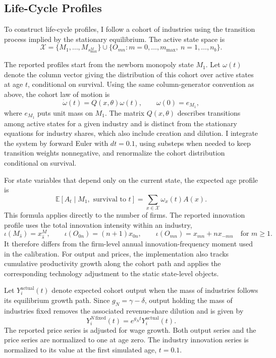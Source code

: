 \documentclass[12pt]{article}
\begin{document}
\subsection{Life-Cycle Profiles}\label{app:lifecycle}

To construct life-cycle profiles, I follow a cohort of industries using the transition process implied by the stationary equilibrium. The active state space is
\[
\mathcal X=\{M_1,\ldots,M_{s_{\max}^M}\}\cup\{O_{mn}:m=0,\ldots,m_{\max},\ n=1,\ldots,n_b\}.
\]

The reported profiles start from the newborn monopoly state \(M_1\). Let \(\omega(t)\) denote the column vector giving the distribution of this cohort over active states at age \(t\), conditional on survival. Using the same column-generator convention as above, the cohort law of motion is
\[
\dot{\omega}(t)=Q(x,\theta)\omega(t),
\qquad
\omega(0)=e_{M_1},
\]
where \(e_{M_1}\) puts unit mass on \(M_1\). The matrix \(Q(x,\theta)\) describes transitions among active states for a given industry and is distinct from the stationary equations for industry shares, which also include creation and dilution. I integrate the system by forward Euler with \(dt=0.1\), using substeps when needed to keep transition weights nonnegative, and renormalize the cohort distribution conditional on survival.

For state variables that depend only on the current state, the expected age profile is
\[
\mathbb E[A_t\mid M_1,\text{ survival to }t]=\sum_{x\in\mathcal X}\omega_x(t)A(x).
\]
This formula applies directly to the number of firms. The reported innovation profile uses the total innovation intensity within an industry,
\[
\iota(M_{\hat s})=x^M_{\hat s},
\qquad
\iota(O_{0n})=(n+1)x_{0n},
\qquad
\iota(O_{mn})=x_{mn}+n x_{-mn}
\quad\text{for }m\geq1.
\]
It therefore differs from the firm-level annual innovation-frequency moment used in the calibration. For output and prices, the implementation also tracks cumulative productivity growth along the cohort path and applies the corresponding technology adjustment to the static state-level objects.

Let \(Y_i^{\mathrm{actual}}(t)\) denote expected cohort output when the mass of industries follows its equilibrium growth path. Since \(g_N=\gamma-\delta\), output holding the mass of industries fixed removes the associated revenue-share dilution and is given by
\[
Y_i^{N\mathrm{\ fixed}}(t)
=e^{g_Nt}Y_i^{\mathrm{actual}}(t).
\]
The reported price series is adjusted for wage growth. Both output series and the price series are normalized to one at age zero. The industry innovation series is normalized to its value at the first simulated age, \(t=0.1\).
\end{document}
